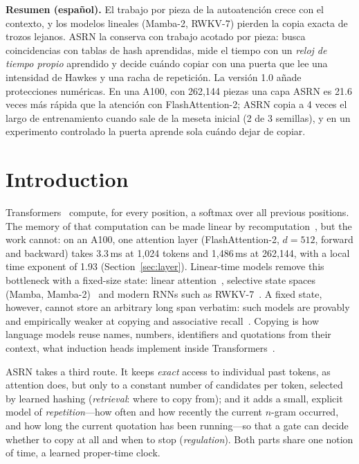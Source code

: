 \documentclass[11pt]{article}
\begin{document}
\noindent\textbf{Resumen (español).} El trabajo por pieza de la autoatención crece con el contexto, y los modelos
lineales (Mamba-2, RWKV-7) pierden la copia exacta de trozos lejanos. ASRN la conserva con trabajo acotado por pieza:
busca coincidencias con tablas de hash aprendidas, mide el tiempo con un \emph{reloj de tiempo propio} aprendido y
decide cuándo copiar con una puerta que lee una intensidad de Hawkes y una racha de repetición. La versión 1.0 añade
protecciones numéricas. En una A100, con 262{,}144 piezas una capa ASRN es 21.6 veces más rápida que la atención con
FlashAttention-2; ASRN copia a 4 veces el largo de entrenamiento cuando sale de la meseta inicial (2 de 3 semillas), y
en un experimento controlado la puerta aprende sola cuándo dejar de copiar.

\section{Introduction}

Transformers~\cite{vaswani2017attention} compute, for every position, a softmax over all previous positions. The
memory of that computation can be made linear by recomputation~\cite{dao2022flashattention}, but the work cannot: on an
A100, one attention layer (FlashAttention-2, $d=512$, forward and backward) takes 3.3\,ms at 1{,}024 tokens and
1{,}486\,ms at 262{,}144, with a local time exponent of 1.93 (Section~\ref{sec:layer}). Linear-time models remove this
bottleneck with a fixed-size state: linear attention~\cite{katharopoulos2020transformers}, selective state spaces
(Mamba, Mamba-2)~\cite{gu2023mamba,dao2024transformers} and modern RNNs such as RWKV-7~\cite{peng2025rwkv7}. A fixed
state, however, cannot store an arbitrary long span verbatim: such models are provably and empirically weaker at copying
and associative recall~\cite{jelassi2024repeat,arora2023zoology}. Copying is how language models reuse names, numbers,
identifiers and quotations from their context, what induction heads implement inside
Transformers~\cite{olsson2022induction}.

ASRN takes a third route. It keeps \emph{exact} access to individual past tokens, as attention does, but only to a
constant number of candidates per token, selected by learned hashing (\emph{retrieval}: where to copy from); and it
adds a small, explicit model of \emph{repetition}---how often and how recently the current $n$-gram occurred, and how
long the current quotation has been running---so that a gate can decide whether to copy at all and when to stop
(\emph{regulation}). Both parts share one notion of time, a learned proper-time clock.
\end{document}
